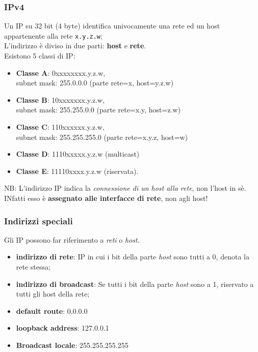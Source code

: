 \documentclass[a4paper,11pt]{article}
\def\code#1{\texttt{#1}}
\begin{document}
\subsubsection{IPv4}
Un IP su 32 bit (4 byte) identifica univocamente una rete ed un host appartenente alla rete \code{x.y.z.w};\\
L'indirizzo è diviso in due parti: \textbf{host} e \textbf{rete}.\\
Esistono 5 classi di IP:
\begin{itemize}
\item\textbf{Classe A}: 0xxxxxxxx.y.z.w,\\ subnet mask: 255.0.0.0 (parte rete=x, host=y.z.w)
\item\textbf{Classe B}: 10xxxxxxx.y.z.w,\\ subnet mask: 255.255.0.0 (parte rete=x.y, host=z.w)
\item\textbf{Classe C}: 110xxxxxx.y.z.w,\\ subnet mask: 255.255.255.0 (parte rete=x.y.z, host=w)
\item\textbf{Classe D}: 1110xxxxx.y.z.w (multicast)
\item\textbf{Classe E}: 11110xxxx.y.z.w (riservata).
\end{itemize} 
NB: L'indirizzo IP indica la \textit{connessione di un host alla rete}, non l'host in sè. INfatti esso è \textbf{assegnato alle interfacce di rete}, non agli host!
\subsubsection{Indirizzi speciali}
Gli IP possono far riferimento a \textit{reti} o \textit{host}. 
\begin{itemize}
\item \textbf{indirizzo di rete}: IP in cui i bit della parte \textit{host} sono tutti a 0, denota la rete stessa;
\item \textbf{indirizzo di broadcast}: Se tutti i bit della parte \textit{host} sono a 1, riservato a tutti gli host della rete;
\item \textbf{default route}: 0.0.0.0
\item \textbf{loopback address}: 127.0.0.1
\item\textbf{Broadcast locale}: 255.255.255.255
\end{itemize}
\end{document}
